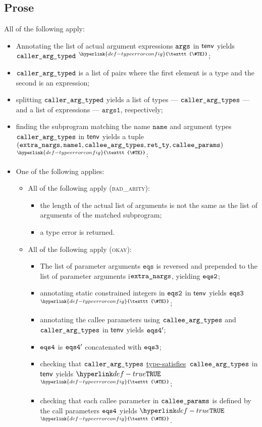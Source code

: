 \documentclass{book}
\newcommand\TypeErrorConfig[0]{\hyperlink{def-typeerrorconfig}{\texttt{\#TE}}}
\newcommand\ProseOrTypeError[0]{\hyperlink{def-proseortypeerror}{$^{\TypeErrorConfig}$}}
\newcommand\typesatisfies[0]{\hyperlink{def-typesatisfies}{type-satisfies}}
\newcommand\eqs[0]{\texttt{eqs}}
\newcommand\nameone[0]{\texttt{name1}}
\newcommand\vargsone[0]{\texttt{args1}}
\newcommand\name[0]{\texttt{name}}
\begin{document}
\subsection{Prose}
All of the following apply:
\begin{itemize}
  \item Annotating the list of actual argument expressions $\texttt{args}$ in $\textsf{tenv}$ yields $\texttt{caller\_arg\_typed}$ \ProseOrTypeError;
  \item $\texttt{caller\_arg\_typed}$ is a list of pairs where the first element is a type and the second is an expression;
  \item splitting $\texttt{caller\_arg\_typed}$ yields a list of types --- $\texttt{caller\_arg\_types}$ --- and a list of expressions ---
  $\vargsone$, respectively;
  \item finding the subprogram matching the name $\name$ and argument types $\texttt{caller\_arg\_types}$ in $\textsf{tenv}$
  yields a tuple $(\extranargs, \nameone, \calleeargtypes, \retty, \calleeparams)$ \ProseOrTypeError;
  \item One of the following applies:
  \begin{itemize}
    \item All of the following apply (\textsc{bad\_arity}):
    \begin{itemize}
      \item the length of the actual list of arguments is not the same as the list of arguments of the matched
      subprogram;
      \item a type error is returned.
    \end{itemize}

    \item All of the following apply (\textsc{okay}):
    \begin{itemize}
      \item The list of parameter arguments $\eqs$ is reversed and prepended to the list of parameter arguments
      i$\texttt{extra\_nargs}$, yielding $\texttt{eqs2}$;
      \item annotating static constrained integers in $\texttt{eqs2}$ in $\textsf{tenv}$ yields $\texttt{eqs3}$ \ProseOrTypeError;
      \item annotating the callee parameters using $\texttt{callee\_arg\_types}$ and $\texttt{caller\_arg\_types}$ in $\textsf{tenv}$
      yields $\texttt{eqs4}'$;
      \item $\texttt{eqs4}$ is $\texttt{eqs4}'$ concatenated with $\texttt{eqs3}$;
      \item checking that $\texttt{caller\_arg\_types}$ \typesatisfies\ $\texttt{callee\_arg\_types}$ in $\textsf{tenv}$ yields
      $\True$ \ProseOrTypeError;
      \item checking that each callee parameter in $\texttt{callee\_params}$ is defined by the call
      parameters $\texttt{eqs4}$ yields $\True$ \ProseOrTypeError.
    \end{itemize}
  \end{itemize}
\end{itemize}
\end{document}

